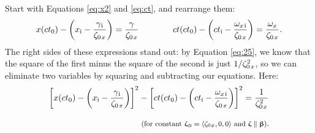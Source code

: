 \documentclass[12pt]{article}
\newcommand{\vvbeta}{\bm{\upbeta}}
\newcommand{\vvzeta}{\bm{\upzeta}}
\begin{document}
Start with Equations \ref{eq:x2} and \ref{eq:ct}, and rearrange them:
\begin{equation*}
x(ct_0) - \left( x_{\mathrm{i}} - \dfrac{\gamma_{\mkern1mu \mathrm{i}}}{ \zeta_{0 \mkern2mu x}} \right) = \dfrac{\gamma }{ \zeta_{0 \mkern2mu x}} \qquad \qquad  ct(ct_0) - \left( ct_{\mathrm{i}} - \dfrac{\omega_{x \mkern2mu \textrm{i} }}{ \zeta_{0 \mkern2mu x}} \right) = \dfrac{\omega_x }{ \zeta_{0 \mkern2mu x}} .
\end{equation*}
The right sides of these expressions stand out: by Equation \ref{eq:25}, we know that the square of the first minus the square of the second is just $1 / \zeta^2_{0 \mkern2mu x}$, so we can eliminate two variables by squaring and subtracting our equations. Here:
\begin{equation}\label{eq:hm}
\begin{aligned}
\left[ x(ct_0) - \left( x_{\mathrm{i}} - \dfrac{\gamma_{\mkern1mu \mathrm{i}}}{\zeta_{0 \mkern2mu x}} \right) \right] ^2 &- \left[ ct(ct_0) - \left( ct_{\mathrm{i}} - \dfrac{\omega_{x \mkern2mu \textrm{i} }}{ \zeta_{0 \mkern2mu x}} \right) \right] ^2 = \dfrac{1}{ \zeta^2_{0 \mkern2mu x}} \\[8pt]
& \textrm{\footnotesize{ (for constant $\vvzeta_{\mkern1mu 0} = \langle \zeta_{0 \mkern1mu x} , 0, 0 \rangle$ and $\vvzeta \parallel \vvbeta$)}}.
\end{aligned}
\end{equation}
\end{document}
